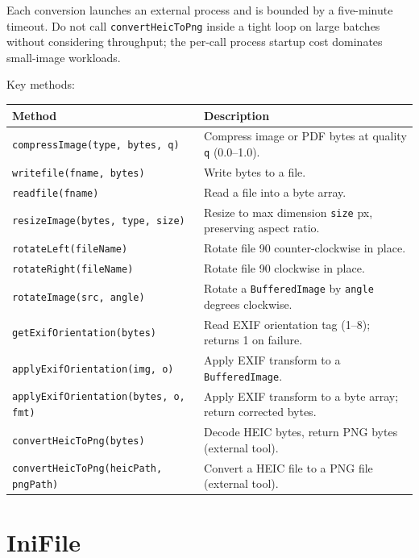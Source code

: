 \begin{warnbox}
Each conversion launches an external process and is bounded by a five-minute timeout.  Do not call \texttt{convertHeicToPng} inside a tight loop on large batches without considering throughput; the per-call process startup cost dominates small-image workloads.
\end{warnbox}

\noindent
Key methods:

\begin{longtable}{P{5.2cm}P{5.3cm}}
\toprule
\textbf{Method} & \textbf{Description} \\
\midrule
\endhead
\texttt{compressImage(type, bytes, q)} & Compress image or PDF bytes at quality \texttt{q} (0.0--1.0). \\
\texttt{writefile(fname, bytes)} & Write bytes to a file. \\
\texttt{readfile(fname)} & Read a file into a byte array. \\
\texttt{resizeImage(bytes, type, size)} & Resize to max dimension \texttt{size} px, preserving aspect ratio. \\
\texttt{rotateLeft(fileName)} & Rotate file 90\textdegree{} counter-clockwise in place. \\
\texttt{rotateRight(fileName)} & Rotate file 90\textdegree{} clockwise in place. \\
\texttt{rotateImage(src, angle)} & Rotate a \texttt{BufferedImage} by \texttt{angle} degrees clockwise. \\
\texttt{getExifOrientation(bytes)} & Read EXIF orientation tag (1--8); returns 1 on failure. \\
\texttt{applyExifOrientation(img, o)} & Apply EXIF transform to a \texttt{BufferedImage}. \\
\texttt{applyExifOrientation(\allowbreak bytes, o, fmt)} & Apply EXIF transform to a byte array; return corrected bytes. \\
\texttt{convertHeicToPng(bytes)} & Decode HEIC bytes, return PNG bytes (external tool). \\
\texttt{convertHeicToPng(heicPath, pngPath)} & Convert a HEIC file to a PNG file (external tool). \\
\bottomrule
\end{longtable}

\section{IniFile}
\label{sec:util-inifile}

